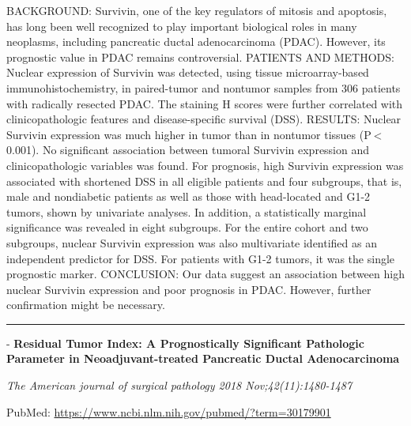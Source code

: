 \documentclass[]{article}
\begin{document}
BACKGROUND: Survivin, one of the key regulators of mitosis and
apoptosis, has long been well recognized to play important biological
roles in many neoplasms, including pancreatic ductal adenocarcinoma
(PDAC). However, its prognostic value in PDAC remains controversial.
PATIENTS AND METHODS: Nuclear expression of Survivin was detected, using
tissue microarray-based immunohistochemistry, in paired-tumor and
nontumor samples from 306 patients with radically resected PDAC. The
staining H scores were further correlated with clinicopathologic
features and disease-specific survival (DSS). RESULTS: Nuclear Survivin
expression was much higher in tumor than in nontumor tissues
(P \textless{} 0.001). No significant association between tumoral
Survivin expression and clinicopathologic variables was found. For
prognosis, high Survivin expression was associated with shortened DSS in
all eligible patients and four subgroups, that is, male and nondiabetic
patients as well as those with head-located and G1-2 tumors, shown by
univariate analyses. In addition, a statistically marginal significance
was revealed in eight subgroups. For the entire cohort and two
subgroups, nuclear Survivin expression was also multivariate identified
as an independent predictor for DSS. For patients with G1-2 tumors, it
was the single prognostic marker. CONCLUSION: Our data suggest an
association between high nuclear Survivin expression and poor prognosis
in PDAC. However, further confirmation might be necessary.

{}

{}

\begin{center}\rule{0.5\linewidth}{\linethickness}\end{center}

 - \textbf{Residual Tumor Index: A Prognostically Significant Pathologic
Parameter in Neoadjuvant-treated Pancreatic Ductal Adenocarcinoma}

\emph{The American journal of surgical pathology 2018
Nov;42(11):1480-1487}

PubMed: \url{https://www.ncbi.nlm.nih.gov/pubmed/?term=30179901}
\end{document}

